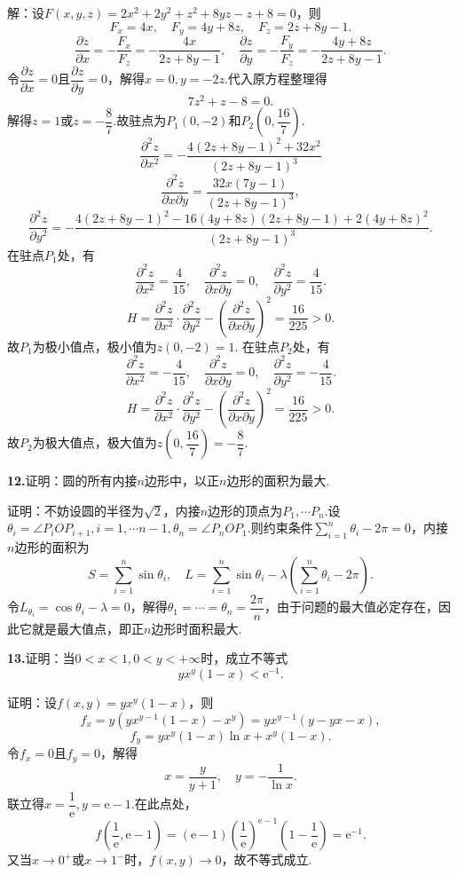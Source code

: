 \documentclass[12pt, a4paper]{article}
\newcommand{\e}{\mathrm{e}}
\begin{document}
解：设\(F(x, y, z) = 2x^2 + 2y^2 + z^2 + 8yz - z + 8 = 0\)，则
\[F_x = 4x, \quad F_y = 4y + 8z, \quad F_z = 2z + 8y - 1.\]
\[\frac{\partial z}{\partial x} = -\frac{F_x}{F_z} = -\frac{4x}{2z + 8y - 1}, \quad \frac{\partial z}{\partial y} = -\frac{F_y}{F_z} = -\frac{4y + 8z}{2z + 8y - 1}.\]
令\(\dfrac{\partial z}{\partial x} = 0\)且\(\dfrac{\partial z}{\partial y} = 0\)，解得\(x = 0, y = -2z\).代入原方程整理得
\[7z^2 +z - 8 = 0.\]
解得\(z = 1\)或\(z = -\dfrac{8}{7}\).故驻点为\(P_1(0, -2)\)和\(P_2\left(0, \dfrac{16}{7}\right)\).
\[\frac{\partial^2 z}{\partial x^2} = -\frac{4(2z + 8y - 1)^2 + 32x^2}{(2z + 8y - 1)^3}\]
\[\frac{\partial^2 z}{\partial x \partial y} = \frac{32x(7y - 1)}{(2z + 8y - 1)^3},\]
\[\frac{\partial^2 z}{\partial y^2} = -\frac{4(2z + 8y - 1)^2 - 16(4y + 8z)(2z + 8y - 1) + 2(4y + 8z)^2}{(2z + 8y - 1)^3}.\]
在驻点\(P_1\)处，有
\[\frac{\partial^2 z}{\partial x^2} = \frac{4}{15}, \quad \frac{\partial^2 z}{\partial x \partial y} = 0, \quad \frac{\partial^2 z}{\partial y^2} = \frac{4}{15}.\]
\[H = \frac{\partial^2 z}{\partial x^2} \cdot \frac{\partial^2 z}{\partial y^2} - \left(\frac{\partial^2 z}{\partial x \partial y}\right)^2 = \frac{16}{225} > 0.\]
故\(P_1\)为极小值点，极小值为\(z(0, -2) = 1\).
在驻点\(P_2\)处，有
\[\frac{\partial^2 z}{\partial x^2} = -\frac{4}{15}, \quad \frac{\partial^2 z}{\partial x \partial y} = 0, \quad \frac{\partial^2 z}{\partial y^2} = -\frac{4}{15}.\]
\[H = \frac{\partial^2 z}{\partial x^2} \cdot \frac{\partial^2 z}{\partial y^2} - \left(\frac{\partial^2 z}{\partial x \partial y}\right)^2 = \frac{16}{225} > 0.\]
故\(P_2\)为极大值点，极大值为\(z\left(0, \dfrac{16}{7}\right) = -\dfrac{8}{7}\).

\textbf{12.}证明：圆的所有内接\(n\)边形中，以正\(n\)边形的面积为最大.

证明：不妨设圆的半径为\(\sqrt{2}\)，内接\(n\)边形的顶点为\(P_1, \cdots P_n\).设\(\theta_i = \angle P_iOP_{i + 1}, i = 1, \cdots n - 1, \theta_n = \angle P_nOP_1\).则约束条件\(\sum\limits_{i = 1}^{n} \theta_i - 2\pi = 0\)，内接\(n\)边形的面积为
\[S = \sum_{i = 1}^{n} \sin\theta_i,\quad L = \sum_{i = 1}^{n} \sin\theta_i - \lambda\left(\sum_{i = 1}^{n} \theta_i - 2\pi\right).\]
令\(L_{\theta_i} = \cos\theta_i - \lambda = 0\)，解得\(\theta_1 = \cdots = \theta_n = \dfrac{2\pi}{n}\)，由于问题的最大值必定存在，因此它就是最大值点，即正\(n\)边形时面积最大.

\textbf{13.}证明：当\(0 < x < 1, 0 < y < +\infty\)时，成立不等式
\[yx^y(1 - x) < \e^{-1}.\]

证明：设\(f(x, y) = yx^y(1 - x)\)，则
\[f_x = y\left(yx^{y - 1}(1 - x) - x^y\right) = yx^{y - 1}(y - yx - x),\]
\[f_y = yx^y(1 - x)\ln x + x^y(1 - x).\]
令\(f_x = 0\)且\(f_y = 0\)，解得
\[x = \frac{y}{y + 1}, \quad y = -\frac{1}{\ln x}.\]
联立得\(x = \dfrac{1}{\e}, y = \e - 1\).在此点处，
\[f\left(\frac{1}{\e}, \e - 1\right) = (\e - 1)\left(\frac{1}{\e}\right)^{\e - 1}\left(1 - \frac{1}{\e}\right) = \e^{-1}.\]
又当\(x \to 0^+\)或\(x \to 1^-\)时，\(f(x, y) \to 0\)，故不等式成立.
\end{document}
